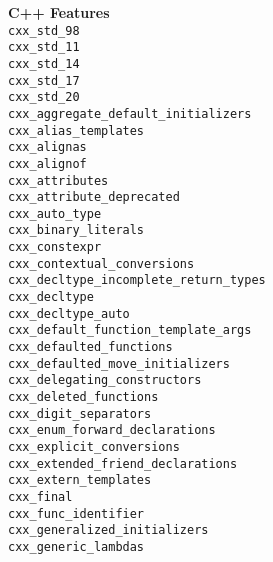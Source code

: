 \documentclass{article}
\newcommand{\cmakecxxfeature}[1]{\lstinline{#1}}
\begin{document}
\begin{minipage}[t]{0.18\linewidth}
\textbf{C++ Features}\\
\cmakecxxfeature{cxx_std_98}\\
\cmakecxxfeature{cxx_std_11}\\
\cmakecxxfeature{cxx_std_14}\\
\cmakecxxfeature{cxx_std_17}\\
\cmakecxxfeature{cxx_std_20}\\
\cmakecxxfeature{cxx_aggregate_default_initializers}\\
\cmakecxxfeature{cxx_alias_templates}\\
\cmakecxxfeature{cxx_alignas}\\
\cmakecxxfeature{cxx_alignof}\\
\cmakecxxfeature{cxx_attributes}\\
\cmakecxxfeature{cxx_attribute_deprecated}\\
\cmakecxxfeature{cxx_auto_type}\\
\cmakecxxfeature{cxx_binary_literals}\\
\cmakecxxfeature{cxx_constexpr}\\
\cmakecxxfeature{cxx_contextual_conversions}\\
\cmakecxxfeature{cxx_decltype_incomplete_return_types}\\
\cmakecxxfeature{cxx_decltype}\\
\cmakecxxfeature{cxx_decltype_auto}\\
\cmakecxxfeature{cxx_default_function_template_args}\\
\cmakecxxfeature{cxx_defaulted_functions}\\
\cmakecxxfeature{cxx_defaulted_move_initializers}\\
\cmakecxxfeature{cxx_delegating_constructors}\\
\cmakecxxfeature{cxx_deleted_functions}\\
\cmakecxxfeature{cxx_digit_separators}\\
\cmakecxxfeature{cxx_enum_forward_declarations}\\
\cmakecxxfeature{cxx_explicit_conversions}\\
\cmakecxxfeature{cxx_extended_friend_declarations}\\
\cmakecxxfeature{cxx_extern_templates}\\
\cmakecxxfeature{cxx_final}\\
\cmakecxxfeature{cxx_func_identifier}\\
\cmakecxxfeature{cxx_generalized_initializers}\\
\cmakecxxfeature{cxx_generic_lambdas}\\

\end{minipage}
\end{document}
